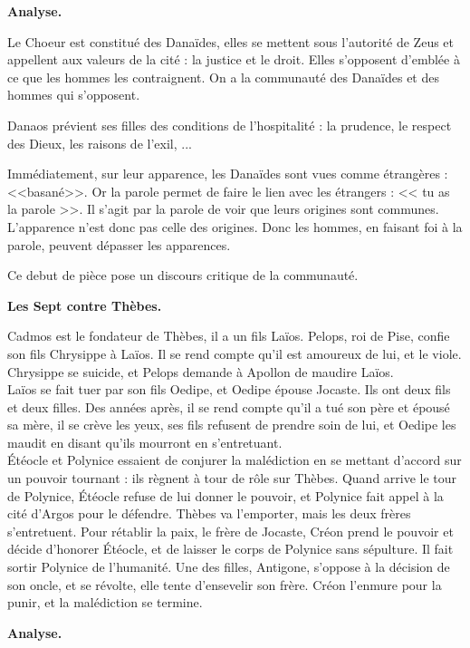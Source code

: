 \documentclass[11pt]{article}
\begin{document}
\bf{Analyse.}

Le Choeur est constitué des Danaïdes, elles se mettent sous l'autorité de Zeus et appellent aux valeurs de la cité : la justice et le droit. Elles s'opposent d'emblée à ce que les hommes les contraignent. On a la communauté des Danaïdes et des hommes qui s'opposent.

Danaos prévient ses filles des conditions de l'hospitalité : la prudence, le respect des Dieux, les raisons de l'exil, ...

Immédiatement, sur leur apparence, les Danaïdes sont vues comme étrangères : <<basané>>. Or la parole permet de faire le lien avec les étrangers : << tu as la parole >>. Il s'agit par la parole de voir que leurs origines sont communes. L'apparence n'est donc pas celle des origines. Donc les hommes, en faisant foi à la parole, peuvent dépasser les apparences.

Ce debut de pièce pose un discours critique de la communauté. 

\bf{Les Sept contre Thèbes.}

Cadmos est le fondateur de Thèbes, il a un fils Laïos. Pelops, roi de Pise, confie son fils Chrysippe à Laïos. Il se rend compte qu'il est amoureux de lui, et le viole. Chrysippe se suicide, et Pelops demande à Apollon de maudire Laïos.\\
Laïos se fait tuer par son fils Oedipe, et Oedipe épouse Jocaste. Ils ont deux fils et deux filles. Des années après, il se rend compte qu'il a tué son père et épousé sa mère, il se crève les yeux, ses fils refusent de prendre soin de lui, et Oedipe les maudit en disant qu'ils mourront en s'entretuant.\\
Étéocle et Polynice essaient de conjurer la malédiction en se mettant d'accord sur un pouvoir tournant : ils règnent à tour de rôle sur Thèbes. Quand arrive le tour de Polynice, Étéocle refuse de lui donner le pouvoir, et Polynice fait appel à la cité d'Argos pour le défendre. Thèbes va l'emporter, mais les deux frères s'entretuent. Pour rétablir la paix, le frère de Jocaste, Créon prend le pouvoir et décide d'honorer Étéocle, et de laisser le corps de Polynice sans sépulture. Il fait sortir Polynice de l'humanité.
Une des filles, Antigone, s'oppose à la décision de son oncle, et se révolte, elle tente d'ensevelir son frère. Créon l'enmure pour la punir, et la malédiction se termine.

\bf{Analyse.}
\end{document}
